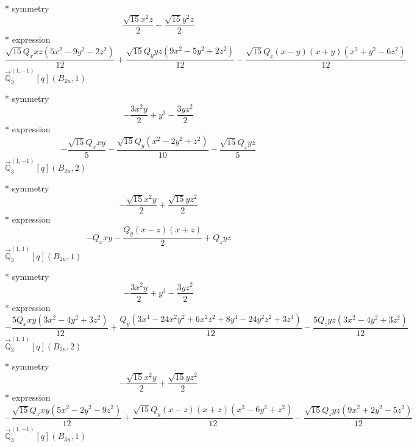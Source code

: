 \documentclass[fleqn,8pt]{jsarticle}
\begin{document}
\noindent\quad ** symmetry
\begin{dmath*}
\frac{\sqrt{15} x^{2} z}{2} - \frac{\sqrt{15} y^{2} z}{2}
\end{dmath*}
\noindent\quad ** expression
\begin{dmath*}
\frac{\sqrt{15} Q_{x} x z \left(5 x^{2} - 9 y^{2} - 2 z^{2}\right)}{12} + \frac{\sqrt{15} Q_{y} y z \left(9 x^{2} - 5 y^{2} + 2 z^{2}\right)}{12} - \frac{\sqrt{15} Q_{z} \left(x - y\right) \left(x + y\right) \left(x^{2} + y^{2} - 6 z^{2}\right)}{12}
\end{dmath*}
\noindent\quad $\vec{\mathbb{Q}}_{3}^{(1,-1)}[q](B_{2u},1)$

\noindent\quad ** symmetry
\begin{dmath*}
- \frac{3 x^{2} y}{2} + y^{3} - \frac{3 y z^{2}}{2}
\end{dmath*}
\noindent\quad ** expression
\begin{dmath*}
- \frac{\sqrt{15} Q_{x} x y}{5} - \frac{\sqrt{15} Q_{y} \left(x^{2} - 2 y^{2} + z^{2}\right)}{10} - \frac{\sqrt{15} Q_{z} y z}{5}
\end{dmath*}
\noindent\quad $\vec{\mathbb{Q}}_{3}^{(1,-1)}[q](B_{2u},2)$

\noindent\quad ** symmetry
\begin{dmath*}
- \frac{\sqrt{15} x^{2} y}{2} + \frac{\sqrt{15} y z^{2}}{2}
\end{dmath*}
\noindent\quad ** expression
\begin{dmath*}
- Q_{x} x y - \frac{Q_{y} \left(x - z\right) \left(x + z\right)}{2} + Q_{z} y z
\end{dmath*}
\noindent\quad $\vec{\mathbb{Q}}_{3}^{(1,1)}[q](B_{2u},1)$

\noindent\quad ** symmetry
\begin{dmath*}
- \frac{3 x^{2} y}{2} + y^{3} - \frac{3 y z^{2}}{2}
\end{dmath*}
\noindent\quad ** expression
\begin{dmath*}
- \frac{5 Q_{x} x y \left(3 x^{2} - 4 y^{2} + 3 z^{2}\right)}{12} + \frac{Q_{y} \left(3 x^{4} - 24 x^{2} y^{2} + 6 x^{2} z^{2} + 8 y^{4} - 24 y^{2} z^{2} + 3 z^{4}\right)}{12} - \frac{5 Q_{z} y z \left(3 x^{2} - 4 y^{2} + 3 z^{2}\right)}{12}
\end{dmath*}
\noindent\quad $\vec{\mathbb{Q}}_{3}^{(1,1)}[q](B_{2u},2)$

\noindent\quad ** symmetry
\begin{dmath*}
- \frac{\sqrt{15} x^{2} y}{2} + \frac{\sqrt{15} y z^{2}}{2}
\end{dmath*}
\noindent\quad ** expression
\begin{dmath*}
- \frac{\sqrt{15} Q_{x} x y \left(5 x^{2} - 2 y^{2} - 9 z^{2}\right)}{12} + \frac{\sqrt{15} Q_{y} \left(x - z\right) \left(x + z\right) \left(x^{2} - 6 y^{2} + z^{2}\right)}{12} - \frac{\sqrt{15} Q_{z} y z \left(9 x^{2} + 2 y^{2} - 5 z^{2}\right)}{12}
\end{dmath*}
\noindent\quad $\vec{\mathbb{Q}}_{3}^{(1,-1)}[q](B_{3u},1)$
\end{document}
